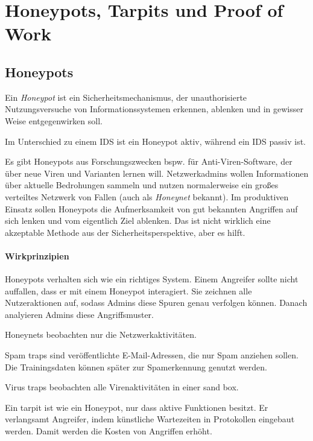 \section{Honeypots, Tarpits und Proof of Work}%
\label{sec:honeypots_tarpits_und_proof_of_work}

\subsection{Honeypots}%
\label{sub:honeypots}

\begin{definition}
  Ein \emph{Honeypot} ist ein Sicherheitsmechanismus, der unauthorisierte Nutzungsversuche
  von Informationssystemen erkennen, ablenken und in gewisser Weise entgegenwirken soll.
\end{definition}

Im Unterschied zu einem IDS ist ein Honeypot aktiv, während ein IDS passiv ist.

Es gibt Honeypots aus Forschungszwecken bspw. für Anti-Viren-Software, der über neue Viren
und Varianten lernen will.
Netzwerkadmins wollen Informationen über aktuelle Bedrohungen sammeln und nutzen
normalerweise ein großes verteiltes Netzwerk von Fallen (auch als \emph{Honeynet}
bekannt).
Im produktiven Einsatz sollen Honeypots die Aufmerksamkeit von gut bekannten Angriffen auf
sich lenken und vom eigentlich Ziel ablenken.
Das ist nicht wirklich eine akzeptable Methode aus der Sicherheitsperspektive, aber es
hilft.

\paragraph{Wirkprinzipien}%
\label{par:wirkprinzipien}

Honeypots verhalten sich wie ein richtiges System.
Einem Angreifer sollte nicht auffallen, dass er mit einem Honeypot interagiert.
Sie zeichnen alle Nutzeraktionen auf, sodass Admins diese Spuren genau verfolgen können.
Danach analyieren Admins diese Angriffsmuster.

Honeynets beobachten nur die Netzwerkaktivitäten.

Spam traps sind veröffentlichte E-Mail-Adressen, die nur Spam anziehen sollen.
Die Trainingsdaten können später zur Spamerkennung genutzt werden.

Virus traps beobachten alle Virenaktivitäten in einer sand box.

Ein tarpit ist wie ein Honeypot, nur dass aktive Funktionen besitzt.
Er verlangsamt Angreifer, indem künstliche Wartezeiten in Protokollen eingebaut werden.
Damit werden die Kosten von Angriffen erhöht.

